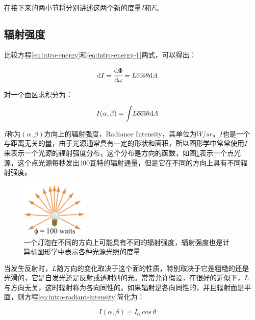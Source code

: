 \noindent 在接下来的两小节将分别讲述这两个新的度量$I$和$E$。





\subsection{辐射强度}
比较方程\ref{eq:intro-energy}和\ref{eq:intro-energy-1}两式，可以得出：

\begin{equation}
	{\rm d}I= \cfrac{{\rm d}\Phi}{{\rm d}\omega}=L\overline{\cos}\theta {\rm d}A
\end{equation}

\noindent 对一个面区求积分为：

\begin{equation}\label{eq:intro-radiant-intensity}
	I(\alpha,\beta)={\rm \int} L\overline{\cos}\theta {\rm d}A
\end{equation}

\noindent $I$称为$(\alpha,\beta)$方向上的辐射强度，Radiance Intensity，其单位为$W/sr$。$I$也是一个与距离无关的量，由于光源通常具有一定的形状和面积，所以图形学中常常使用$I$来表示一个光源的辐射强度分布，这个分布是方向的函数，如图\ref{f:intro-radiant-intensity}表示一个点光源，这个点光源每秒发出100瓦特的辐射通量，但是它在不同的方向上具有不同辐射强度。

\begin{figure}
\sidecaption
	\includegraphics[width=0.3\textwidth]{figures/intro/radiant-intensity}
	\caption{一个灯泡在不同的方向上可能具有不同的辐射强度，辐射强度也是计算机图形学中表示各种光源光照的度量}
	\label{f:intro-radiant-intensity}
\end{figure}

当发生反射时，$L$随方向的变化取决于这个面的性质，特别取决于它是粗糙的还是光滑的，它是自发光还是反射或透射别的光。常常允许假设，在很好的近似下，$L$与方向无关，这时辐射称为各向同性的。如果辐射是各向同性的，并且辐射面是平面，则方程\ref{eq:intro-radiant-intensity}简化为：

\begin{equation}\label{eq:intro-radiant-intensity-1}
	I(\alpha,\beta)=I_0 \overline{\cos}\theta 
\end{equation}

